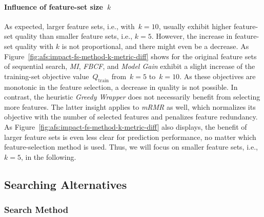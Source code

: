 \documentclass{article}
\theoremstyle{definition}
\begin{document}
\paragraph{Influence of feature-set size~$k$}

As expected, larger feature sets, i.e., with~$k=10$, usually exhibit higher feature-set quality than smaller feature sets, i.e., $k=5$.
However, the increase in feature-set quality with $k$ is not proportional, and there might even be a decrease.
As Figure~\ref{fig:afs:impact-fs-method-k-metric-diff} shows for the original feature sets of sequential search, \emph{MI}, \emph{FBCF}, and \emph{Model Gain} exhibit a slight increase of the training-set objective value~$Q_\text{train}$ from~$k=5$ to~$k=10$.
As these objectives are monotonic in the feature selection, a decrease in quality is not possible.
In contrast, the heuristic \emph{Greedy Wrapper} does not necessarily benefit from selecting more features.
The latter insight applies to \emph{mRMR} as well, which normalizes its objective with the number of selected features and penalizes feature redundancy.
As Figure~\ref{fig:afs:impact-fs-method-k-metric-diff} also displays, the benefit of larger feature sets is even less clear for prediction performance, no matter which feature-selection method is used.
Thus, we will focus on smaller feature sets, i.e., $k=5$, in the following.

\subsection{Searching Alternatives}
\label{sec:afs:evaluation:search}

\subsubsection{Search Method}
\label{sec:afs:evaluation:search:method}
\end{document}
